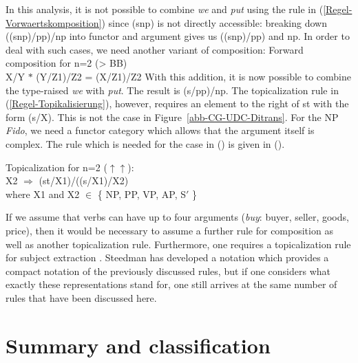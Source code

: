 In this analysis, it is not possible to combine \emph{we} and \emph{put} using the rule in
(\ref{Regel-Vorwaertskomposition}) since (s\bs np) is not directly accessible: 
breaking down ((s\bs np)/pp)/np into functor and argument gives us ((s\bs np)/pp) and np. 
In order to deal with such cases, we need another variant of composition:
\ea
Forward composition for n=2 (> BB)\\
X/Y $*$ (Y/Z1)/Z2 = (X/Z1)/Z2
\z
With this addition, it is now possible to combine the type-raised \emph{we} with \emph{put}. The result is (s/pp)/np.
The topicalization rule in (\ref{Regel-Topikalisierung}), however, requires an element to the right of st with the form
(s/X). This is not the case in Figure~\ref{abb-CG-UDC-Ditrans}. For the NP \emph{Fido}, we need a functor category
which allows that the argument itself is complex. The rule which is needed for the case in
() is given in ().

\ea
\label{Regel-Topikalisierung-zwei}
Topicalization for n=2 ($\uparrow\uparrow$\is{$\uparrow\uparrow$}):\\
X2 $\Rightarrow$ (st/X1)/((s/X1)/X2)\\
where X1 and X2 $\in$ \{ NP, PP, VP, AP, S$'$ \}
\z

\noindent
If we assume that verbs can have up to four arguments (\zb \emph{buy}: buyer,
seller, goods, price), then it would be necessary to assume a further rule for composition as well as another topicalization rule.
Furthermore, one requires a topicalization rule for subject extraction \citep[]{Pollard88a}. Steedman has developed a notation which
provides a compact notation of the previously discussed rules, but if one considers what exactly these representations stand for, one still arrives at the
same number of rules that have been discussed here.%

\section{Summary and classification}
\label{Abschnitt-Relativsaetze-CG}\label{Abschnitt-Ratte-CG}\label{sec-pied-piping-cg}

